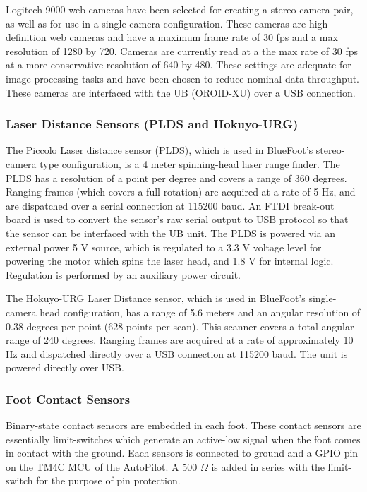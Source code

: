 				Logitech 9000 web cameras have been selected for creating a stereo camera pair, as well as for use in a single camera configuration. These cameras are high-definition web cameras and have a maximum frame rate of 30 fps and a max resolution of 1280 by 720. Cameras are currently read at a the max rate of 30 fps at a more conservative resolution of 640 by 480. These settings are adequate for image processing tasks and have been chosen to reduce nominal data throughput. These cameras are interfaced with the UB (OROID-XU) over a USB connection.

			\subsubsection{Laser Distance Sensors (PLDS and Hokuyo-URG)}

				The Piccolo Laser distance sensor (PLDS), which is used in BlueFoot's stereo-camera type configuration, is a 4 meter spinning-head laser range finder. The PLDS has a resolution of a point per degree and covers a range of 360 degrees. Ranging frames (which covers a full rotation) are acquired at a rate of 5 Hz, and are dispatched over a serial connection at 115200 baud. An FTDI break-out board is used to convert the sensor's raw serial output to USB protocol so that the sensor can be interfaced with the UB unit. The PLDS is powered via an external power 5 V source, which is regulated to a 3.3 V voltage level for powering the motor which spins the laser head, and 1.8 V for internal logic. Regulation is performed by an auxiliary power circuit.

				The Hokuyo-URG Laser Distance sensor, which is used in BlueFoot's single-camera head configuration, has a range of 5.6 meters and an angular resolution of 0.38 degrees per point (628 points per scan). This scanner covers a total angular range of 240 degrees. Ranging frames are acquired at a rate of approximately 10 Hz and dispatched directly over a USB connection at 115200 baud. The unit is powered directly over USB.

			\subsubsection{Foot Contact Sensors}

				Binary-state contact sensors are embedded in each foot. These contact sensors are essentially limit-switches which generate an active-low signal when the foot comes in contact with the ground. Each sensors is connected to ground and a GPIO pin on the TM4C MCU of the AutoPilot. A 500 $\Omega$ is added in series with the limit-switch for the purpose of pin protection.


